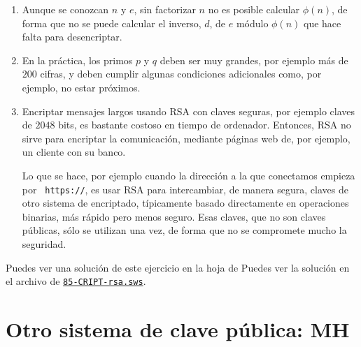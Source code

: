 \begin{enumerate}
\item Aunque se conozcan $n$ y $e$, sin factorizar $n$ no es posible calcular
$\phi(n)$, de forma que no se puede calcular el inverso, $d$, de $e$ m\'odulo
$\phi(n)$ que hace falta para desencriptar.

\item En la pr\'actica, los primos $p$ y $q$ deben ser muy grandes, por ejemplo
m\'as de $200$ cifras, y deben cumplir algunas condiciones adicionales como, por
ejemplo, no estar pr\'oximos. 

\item Encriptar mensajes largos usando RSA con claves seguras, por ejemplo
claves de $2048$ bits, es bastante costoso en tiempo de ordenador. Entonces, RSA
no sirve  para encriptar la comunicaci\'on, mediante p\'aginas web de, por
ejemplo, un cliente con su banco.

Lo que se hace, por ejemplo cuando la direcci\'on a la que conectamos empieza 
por {\tt
https://}, es usar RSA  para intercambiar, de manera segura,  claves de otro
sistema de encriptado, t\'ipicamente basado directamente en operaciones
binarias,  m\'as r\'apido pero menos seguro. Esas claves, que no son claves
p\'ublicas,  s\'olo se utilizan una vez,  de forma que no se compromete mucho la
seguridad.


\end{enumerate}

Puedes ver una soluci\'on de este ejercicio en la hoja de {\sage}
Puedes ver la soluci\'on en el archivo de {\sage}
\href{http://sage.mat.uam.es:8888/home/pub/??/}{\tt 85-CRIPT-rsa.sws}.

\section{Otro sistema de clave p\'ublica: MH}


